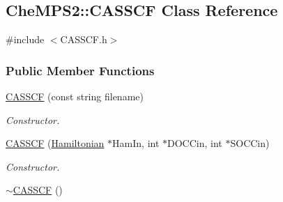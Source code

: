 \hypertarget{classCheMPS2_1_1CASSCF}{\subsection{Che\-M\-P\-S2\-:\-:C\-A\-S\-S\-C\-F Class Reference}
\label{classCheMPS2_1_1CASSCF}
}


{\ttfamily \#include $<$C\-A\-S\-S\-C\-F.\-h$>$}

\subsubsection*{Public Member Functions}
\begin{DoxyCompactItemize}
\item 
\hyperlink{classCheMPS2_1_1CASSCF_aee2071ba5914ed3a6e7120e6d1656144}{C\-A\-S\-S\-C\-F} (const string filename)
\begin{DoxyCompactList}\small\item\em Constructor. \end{DoxyCompactList}\item 
\hyperlink{classCheMPS2_1_1CASSCF_a9c0aeea016f892a6b4a72cee8a37bd96}{C\-A\-S\-S\-C\-F} (\hyperlink{classCheMPS2_1_1Hamiltonian}{Hamiltonian} $\ast$Ham\-In, int $\ast$D\-O\-C\-Cin, int $\ast$S\-O\-C\-Cin)
\begin{DoxyCompactList}\small\item\em Constructor. \end{DoxyCompactList}\item 
\hypertarget{classCheMPS2_1_1CASSCF_a20937fd3dbc5c5f3fa2e7ffd4f751900}{\hyperlink{classCheMPS2_1_1CASSCF_a20937fd3dbc5c5f3fa2e7ffd4f751900}{$\sim$\-C\-A\-S\-S\-C\-F} ()}\label{classCheMPS2_1_1CASSCF_a20937fd3dbc5c5f3fa2e7ffd4f751900}


\end{DoxyCompactItemize}
